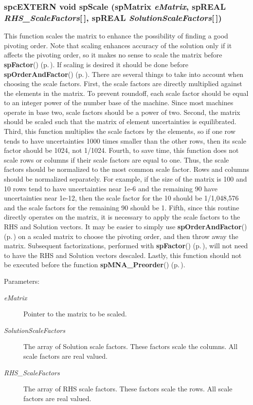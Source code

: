 \subsubsection{\setlength{\rightskip}{0pt plus 5cm}spc\-EXTERN void sp\-Scale ({\bf sp\-Matrix} {\em e\-Matrix}, sp\-REAL {\em RHS\_\-Scale\-Factors}[$\,$], sp\-REAL {\em Solution\-Scale\-Factors}[$\,$])}\label{spMatrix_8h_a51}


This function scales the matrix to enhance the possibility of finding a good pivoting order. Note that scaling enhances accuracy of the solution only if it affects the pivoting order, so it makes no sense to scale the matrix before {\bf sp\-Factor}() {\rm (p.\,\pageref{spMatrix_8h_a30})}. If scaling is desired it should be done before {\bf sp\-Order\-And\-Factor}() {\rm (p.\,\pageref{spMatrix_8h_a46})}. There are several things to take into account when choosing the scale factors. First, the scale factors are directly multiplied against the elements in the matrix. To prevent roundoff, each scale factor should be equal to an integer power of the number base of the machine. Since most machines operate in base two, scale factors should be a power of two. Second, the matrix should be scaled such that the matrix of element uncertainties is equilibrated. Third, this function multiplies the scale factors by the elements, so if one row tends to have uncertainties 1000 times smaller than the other rows, then its scale factor should be 1024, not 1/1024. Fourth, to save time, this function does not scale rows or columns if their scale factors are equal to one. Thus, the scale factors should be normalized to the most common scale factor. Rows and columns should be normalized separately. For example, if the size of the matrix is 100 and 10 rows tend to have uncertainties near 1e-6 and the remaining 90 have uncertainties near 1e-12, then the scale factor for the 10 should be 1/1,048,576 and the scale factors for the remaining 90 should be 1. Fifth, since this routine directly operates on the matrix, it is necessary to apply the scale factors to the RHS and Solution vectors. It may be easier to simply use {\bf sp\-Order\-And\-Factor}() {\rm (p.\,\pageref{spMatrix_8h_a46})} on a scaled matrix to choose the pivoting order, and then throw away the matrix. Subsequent factorizations, performed with {\bf sp\-Factor}() {\rm (p.\,\pageref{spMatrix_8h_a30})}, will not need to have the RHS and Solution vectors descaled. Lastly, this function should not be executed before the function {\bf sp\-MNA\_\-Preorder}() {\rm (p.\,\pageref{spMatrix_8h_a44})}.\begin{Desc}
\item[Parameters: ]\par
\begin{description}
\item[{\em 
e\-Matrix}]Pointer to the matrix to be scaled. \item[{\em 
Solution\-Scale\-Factors}]The array of Solution scale factors. These factors scale the columns. All scale factors are real valued. \item[{\em 
RHS\_\-Scale\-Factors}]The array of RHS scale factors. These factors scale the rows. All scale factors are real valued. \end{description}
\end{Desc}
